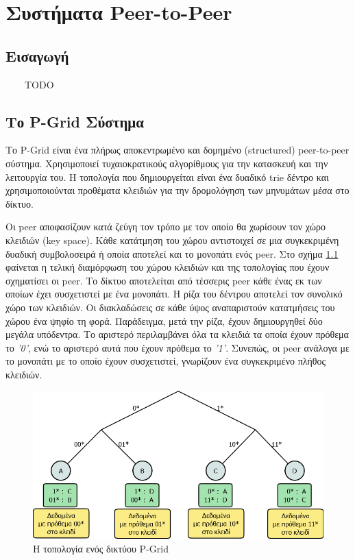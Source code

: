 \chapter{Συστήματα Peer-to-Peer}
\label{chap:P2P}

\section{Εισαγωγή}
\ \ \ \ TODO

\section{Το P-Grid Σύστημα}

Το P-Grid 
\citep{Abererb, Aberer, Abererc, Abererd, Aberer2004, Aberer2003, Aberere, Aberer2002} 
είναι ένα πλήρως αποκεντρωμένο και δομημένο 
(structured) peer-to-peer σύστημα. Χρησιμοποιεί τυχαιοκρατικούς 
αλγορίθμους για την κατασκευή και την λειτουργία του. Η τοπολογία που 
δημιουργείται είναι ένα δυαδικό trie δέντρο και χρησιμοποιούνται 
προθέματα κλειδιών για την δρομολόγηση των μηνυμάτων μέσα στο δίκτυο.

Οι peer αποφασίζουν κατά ζεύγη τον τρόπο με τον οποίο θα 
χωρίσουν τον χώρο κλειδιών (key space). Κάθε κατάτμηση του χώρου 
αντιστοιχεί σε μια συγκεκριμένη δυαδική συμβολοσειρά ή οποία αποτελεί 
και το μονοπάτι ενός peer. Στο σχήμα \ref{fig:PGrid_overlay} φαίνεται η τελική 
διαμόρφωση του χώρου κλειδιών και της τοπολογίας που έχουν σχηματίσει οι 
peer. Το δίκτυο αποτελείται από τέσσερις peer κάθε ένας εκ των οποίων 
έχει συσχετιστεί με ένα μονοπάτι. Η ρίζα του δέντρου αποτελεί τον 
συνολικό χώρο των κλειδιών. Οι διακλαδώσεις σε κάθε ύψος αναπαριστούν 
κατατμήσεις του χώρου ένα ψηφίο τη φορά. Παράδειγμα, μετά την ρίζα, 
έχουν δημιουργηθεί δύο μεγάλα υπόδεντρα. Το αριστερό περιλαμβάνει όλα τα 
κλειδιά τα οποία έχουν πρόθεμα το \textit{'0'}, ενώ το αριστερό αυτά που έχουν 
πρόθεμα το \textit{'1'}. Συνεπώς, οι peer ανάλογα με το μονοπάτι με το οποίο 
έχουν συσχετιστεί, γνωρίζουν ένα συγκεκριμένο πλήθος κλειδιών.

\begin{figure}[h]
\centering
\includegraphics[scale=0.4]{Figures/P2P_PGrid/PGrid_overlay_network.png}
\caption{Η τοπολογία ενός δικτύου P-Grid}
\label{fig:PGrid_overlay}
\end{figure}

